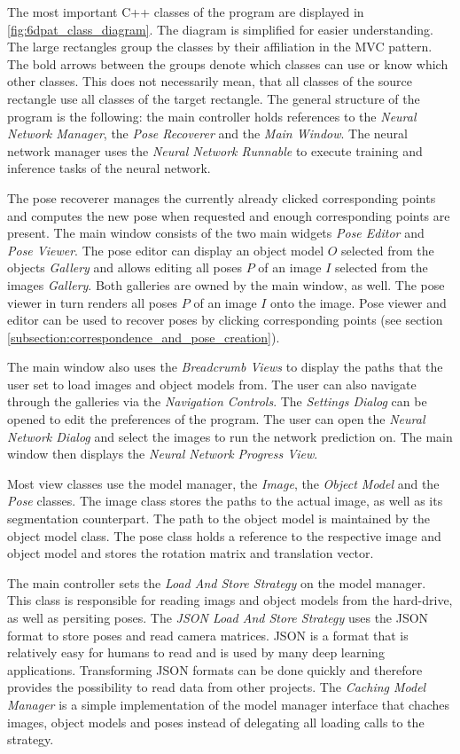 The most important C++ classes of the program are displayed in \fig \ref{fig:6dpat_class_diagram}. The diagram is simplified for easier understanding. The large rectangles group the classes by their affiliation in the MVC pattern. The bold arrows between the groups denote which classes can use or know which other classes. This does not necessarily mean, that all classes of the source rectangle use all classes of the target rectangle. The general structure of the program is the following: the main controller holds references to the \textit{Neural Network Manager}, the \textit{Pose Recoverer} and the \textit{Main Window}. The neural network manager uses the \textit{Neural Network Runnable} to execute training and inference tasks of the neural network. 

The pose recoverer manages the currently already clicked corresponding points and computes the new pose when requested and enough corresponding points are present. The main window consists of the two main widgets \textit{Pose Editor} and \textit{Pose Viewer}. The pose editor can display an object model $O$ selected from the objects \textit{Gallery} and allows editing all poses $P$ of an image $I$ selected from the images \textit{Gallery}. Both galleries are owned by the main window, as well. The pose viewer in turn renders all poses $P$ of an image $I$ onto the image. Pose viewer and editor can be used to recover poses by clicking corresponding points (see section \ref{subsection:correspondence_and_pose_creation}). 

The main window also uses the \textit{Breadcrumb Views} to display the paths that the user set to load images and object models from. The user can also navigate through the galleries via the \textit{Navigation Controls}. The \textit{Settings Dialog} can be opened to edit the preferences of the program. The user can open the \textit{Neural Network Dialog} and select the images to run the network prediction on. The main window then displays the \textit{Neural Network Progress View}. 

Most view classes use the model manager, the \textit{Image}, the \textit{Object Model} and the \textit{Pose} classes. The image class stores the paths to the actual image, as well as its segmentation counterpart. The path to the object model is maintained by the object model class. The pose class holds a reference to the respective image and object model and stores the rotation matrix and translation vector. 

The main controller sets the \textit{Load And Store Strategy} on the model manager. This class is responsible for reading imags and object models from the hard-drive, as well as persiting poses. The \textit{JSON Load And Store Strategy} uses the JSON format to store poses and read camera matrices. JSON is a format that is relatively easy for humans to read and is used by many deep learning applications. Transforming JSON formats can be done quickly and therefore provides the possibility to read data from other projects. The \textit{Caching Model Manager} is a simple implementation of the model manager interface that chaches images, object models and poses instead of delegating all loading calls to the strategy. 


